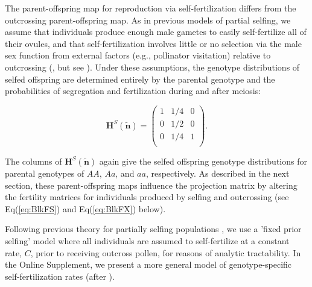 \documentclass[11pt]{article}
\def\mbf#1{\mathbf{#1}}
\begin{document}
The parent-offspring map for reproduction via self-fertilization differs from the outcrossing parent-offspring map. As in previous models of partial selfing, we assume that individuals produce enough male gametes to easily self-fertilize all of their ovules, and that self-fertilization involves little or no selection via the male sex function from external factors (e.g., pollinator visitation) relative to outcrossing (\citealt{Charlesworth1978a,JordanConnallon2014,Olito2017}, but see \citealt{Tazzyman2015}). Under these assumptions, the genotype distributions of selfed offspring are determined entirely by the parental genotype and the probabilities of segregation and fertilization during and after meiosis: 
\begin{linenomath*}
\begin{equation} \label{eq:HS}
	\mbf{H}^S(\tilde{\mbf{n}}) = 
			\left(
			\begin{array}{ccc}
				1 & 1/4 & 0 \\
				0 & 1/2 & 0 \\
				0 & 1/4 & 1 \\
			\end{array} \right).
\end{equation}
\end{linenomath*}
\noindent The columns of $\mbf{H}^S(\tilde{\mbf{n}})$ again give the selfed offspring genotype distributions for parental genotypes of $AA$, $Aa$, and $aa$, respectively. As described in the next section, these parent-offspring maps influence the projection matrix by altering the fertility matrices for individuals produced by selfing and outcrossing (see Eq(\ref{eq:BlkFS}) and Eq(\ref{eq:BlkFX}) below).

Following previous theory for partially selfing populations \cite[e.g.,][]{Charlesworth2010,JordanConnallon2014,Glemin2021}, we use a 'fixed prior selfing' model where all individuals are assumed to self-fertilize at a constant rate, $C$, prior to receiving outcross pollen, for reasons of analytic tractability. In the Online Supplement, we present a more general model of genotype-specific self-fertilization rates (after \citealt{JordanConnallon2014}).
\end{document}
